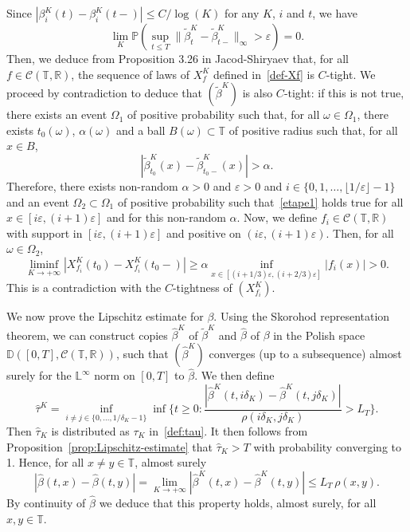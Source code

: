 \documentclass[10pt]{amsart}
\theoremstyle{plain}
\theoremstyle{remark}
\newcommand{\Co}{\mathcal{C}}
\newcommand\T{\mathbb{T}}
\newcommand\R{\mathbb{R}}
\begin{document}
Since $|\beta_{i}^K(t)-\beta_{i}^K(t-)| \leq C/\log(K)$ for any $K$, $i$ and $t$, we have
\[\lim_{K} \mathbb{P}(\sup_{t\le T} \|\widetilde\beta^K_{t}-\widetilde\beta^K_{t-}\|_\infty >\varepsilon) = 0.\]
Then, we deduce from Proposition 3.26 in Jacod-Shiryaev \cite[p.\,315]{jacod} that, for all $f\in \Co(\T,\R)$, the sequence of laws of $X_f^K$ defined in~\eqref{def-Xf} is $C$-tight. We proceed by contradiction to deduce that $(\widetilde{\beta}^K)$ is also $C$-tight: if this is not true, there exists an event $\Omega_1$ of positive probability such that, for all $\omega\in\Omega_1$, there exists $t_0(\omega)$, $\alpha(\omega)$ and a ball $B(\omega)\subset \T$ of positive radius such that, for all $x\in B$, \begin{equation}\label{etape1}
|\widetilde{\beta}^K_{t_0}(x)-\widetilde{\beta}^K_{t_0-}(x)|>\alpha.
\end{equation}Therefore, there exists non-random $\alpha>0$ and $\varepsilon>0$ and $i\in\{0,1,\ldots, \lfloor 1/\varepsilon\rfloor-1\}$ and an event $\Omega_2\subset\Omega_1$ of positive probability such that~\eqref{etape1} holds true for all $x\in[i\varepsilon,(i+1)\varepsilon]$ and for this non-random $\alpha$. Now, we define $f_i\in \Co(\T,\R)$ with support in $[i\varepsilon,(i+1)\varepsilon]$ and positive on $(i\varepsilon,(i+1)\varepsilon)$. Then, for all $\omega\in\Omega_2$,
\[
\liminf_{K\to+\infty}|X_{f_i}^K(t_0)-X_{f_i}^K(t_0-)|\geq \alpha \inf_{x\in [(i+1/3)\varepsilon,(i+2/3)\varepsilon]}|f_i(x)|>0.
\]
This is a contradiction with the $C$-tightness of $(X^K_{f_i})$.

We now prove the Lipschitz estimate for $\beta$. Using the Skorohod representation theorem, we can construct copies $\hat{\beta}^K$ of $\tilde{\beta}^K$ and $\hat{\beta}$ of $\beta$ in the Polish space $\mathbb{D}([0,T], \Co(\T,\mathbb{R}))$, such that $(\hat{\beta}^K)$ converges (up to a subsequence) almost surely for the $\mathbb{L}^\infty$ norm on $[0,T]$ to $\hat{\beta}$. We then define
\[
\hat{\tau}^K=\inf_{i\neq j \in \{0,\ldots,1/\delta_K-1\}}\inf\biggl\{t\geq 0: \frac{|\hat{\beta}^K(t,i\delta_K)-\hat{\beta}^K(t,j\delta_K)|}{\rho(i\delta_K,j\delta_K)}>L_T\biggr\}.
\]
Then $\hat{\tau}_K$ is distributed as $\tau_K$ in~\eqref{def:tau}. It then follows from Proposition~\ref{prop:Lipschitz-estimate} that $\hat{\tau}_K>T$ with probability converging to 1. Hence, for all $x\neq y\in\T$, almost surely
\[
|\hat{\beta}(t,x)-\hat{\beta}(t,y)|=\lim_{K\to+\infty}|\hat{\beta}^K(t,x)-\hat{\beta}^K(t,y)|\leq L_T \,\rho(x,y).
\]
By continuity of $\hat{\beta}$ we deduce that this property holds, almost surely, for all $x,y\in\T$.
\end{document}
